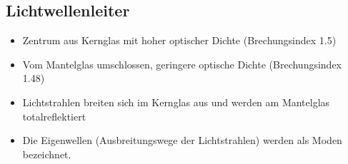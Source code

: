 \subsection{Lichtwellenleiter}{
    { \begin{itemize}[noitemsep]
                \item Zentrum aus Kernglas mit hoher optischer Dichte (Brechungsindex 1.5)
                \item Vom Mantelglas umschlossen, geringere optische Dichte (Brechungsindex 1.48)
                \item Lichtstrahlen breiten sich im Kernglas aus und werden am Mantelglas totalreflektiert
                \item Die Eigenwellen (Ausbreitungswege der Lichtstrahlen) werden als Moden bezeichnet.
            \end{itemize}}
}